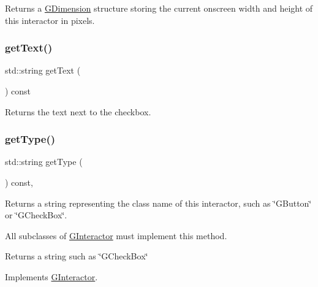 Returns a \mbox{\hyperlink{structGDimension}{G\+Dimension}} structure storing the current onscreen width and height of this interactor in pixels. 

\mbox{\label{classGCheckBox_aff553c50924b836c29f146ed34a7c6ec}} 
\subsubsection{\texorpdfstring{get\+Text()}{getText()}}
{\footnotesize\ttfamily std\+::string get\+Text (\begin{DoxyParamCaption}{ }\end{DoxyParamCaption}) const\hspace{0.3cm}{\ttfamily [virtual]}}



Returns the text next to the checkbox. 

\mbox{\label{classGCheckBox_a9b72ede4ee8520f987a0c01e30654814}} 
\subsubsection{\texorpdfstring{get\+Type()}{getType()}}
{\footnotesize\ttfamily std\+::string get\+Type (\begin{DoxyParamCaption}{ }\end{DoxyParamCaption}) const\hspace{0.3cm}{\ttfamily [override]}, {\ttfamily [virtual]}}



Returns a string representing the class name of this interactor, such as \char`\"{}\+G\+Button\char`\"{} or \char`\"{}\+G\+Check\+Box\char`\"{}. 

All subclasses of \mbox{\hyperlink{classGInteractor}{G\+Interactor}} must implement this method. \begin{DoxyReturn}{Returns}
a string such as \char`\"{}\+G\+Check\+Box\char`\"{} 
\end{DoxyReturn}


Implements \mbox{\hyperlink{classGInteractor_a44c407a54a20dd0f2fff30338289299d}{G\+Interactor}}.

\mbox{\label{classGCheckBox_a3b33a602b31a6b809d020535a59db3b4}} 
